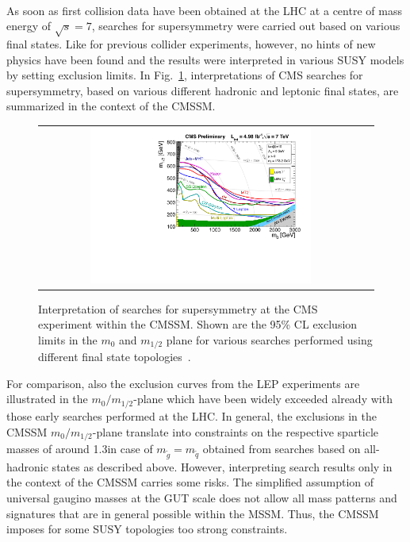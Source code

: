 \\
As soon as first collision data have been obtained at the LHC at a centre of mass energy of $\sqrt{s} = 7$\tev, searches for supersymmetry were carried out based on various final states. Like for previous collider experiments, however, no hints of new physics have been found and the results were interpreted in various SUSY models by setting exclusion limits. In Fig.~\ref{fig:CMSSM_7TeV}, interpretations of CMS searches for supersymmetry, based on various different hadronic and leptonic final states, are summarized in the context of the CMSSM. 
\begin{figure}[!tp]
  \centering 
  \begin{tabular}{cc}
    \includegraphics[width=0.7\textwidth]{figures/CMS_SUSY_2011Limits5fb_tanb10.pdf} 
  \end{tabular}
  \caption{Interpretation of searches for supersymmetry at the CMS experiment within the CMSSM. Shown are the 95\% CL exclusion limits in the $m_0$ and $m_{1/2}$ plane for various searches performed using different final state topologies~\cite{bib:CMS:PhysicsResultsSUS}.}
  \label{fig:CMSSM_7TeV}
\end{figure}
For comparison, also the exclusion curves from the LEP experiments are illustrated in the $m_0/m_{1/2}$-plane which have been widely exceeded already with those early searches performed at the LHC. In general, the exclusions in the CMSSM $m_0/m_{1/2}$-plane translate into constraints on the respective sparticle masses of around 1.3\tev in case of $m_{\tilde{g}} = m_{\tilde{q}}$ obtained from searches based on all-hadronic states as described above. However, interpreting search results only in the context of the CMSSM carries some risks. The simplified assumption of universal gaugino masses at the GUT scale does not allow all mass patterns and signatures that are in general possible within the MSSM. Thus, the CMSSM imposes for some SUSY topologies too strong constraints. \\
